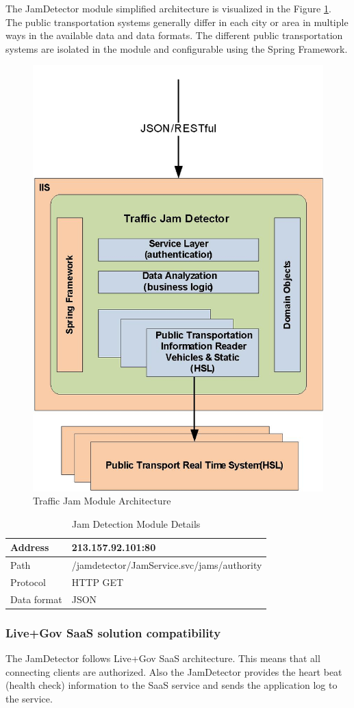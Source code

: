 The JamDetector module simplified architecture is visualized in the
Figure \ref{fig:tjd_architecture}. The public transportation systems
generally differ in each city or area in multiple ways in the
available data and data formats. The different public transportation
systems are isolated in the module and configurable using the Spring
Framework.

\begin{figure}
\centering
\includegraphics[width=0.5 \textwidth]{img/tjd/architecture.jpg}
\caption{Traffic Jam Module Architecture}\label{fig:tjd_architecture}
\end{figure}

\begin{table}
\centering
\begin{tabular}{|l|l|}
\hline
Address     & 213.157.92.101:80 \\ \hline
Path        & /jamdetector/JamService.svc/jams/{authority} \\ \hline
Protocol    & HTTP GET \\ \hline
Data format & JSON \\ \hline
\end{tabular}
\caption{Jam Detection Module Details}
\end{table}

\subsubsection*{\bf Live+Gov SaaS solution compatibility}

The JamDetector follows Live+Gov SaaS architecture. This means that
all connecting clients are authorized. Also the JamDetector provides
the heart beat (health check) information to the SaaS service and
sends the application log to the service.  

